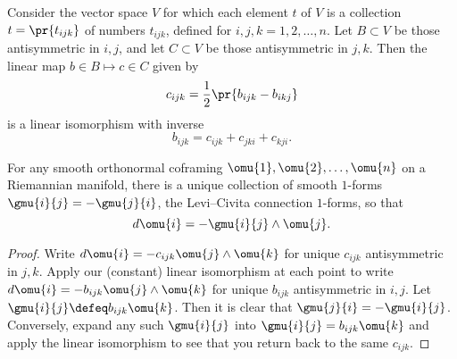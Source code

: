 \begin{lemma}
Consider the vector space \(V\) for which each element \(t\) of \(V\) is a collection \(t=\pr{t_{ijk}}\) of numbers \(t_{ijk}\), defined for \(i,j,k=1,2,\dots,n\).
Let \(B \subset V\) be those antisymmetric in \(i,j\), and let \(C \subset V\) be those antisymmetric in \(j,k\).
Then the linear map \(b \in B \mapsto c \in C\) given by
\[
c_{ijk} = \frac{1}{2}\pr{b_{ijk} - b_{ikj}}
\]
is a linear isomorphism with inverse
\[
b_{ijk} = c_{ijk} + c_{jki} + c_{kji}.
\]
\end{lemma}

\begin{lemma}\label{lemma:flrg.one}
For any smooth orthonormal coframing \(\omu{1}, \omu{2}, \dots, \omu{n}\) on a Riemannian manifold, there is a unique collection of smooth \(1\)-forms \(\gmu{i}{j}=-\gmu{j}{i}\), the Levi--Civita connection \(1\)-forms, so that 
\[
d\omu{i} = -\gmu{i}{j}\wedge\omu{j}.
\]
\end{lemma}
\begin{proof}
Write \(d\omu{i} = -c_{ijk}\omu{j}\wedge\omu{k}\) for unique \(c_{ijk}\) antisymmetric in \(j,k\).
Apply our (constant) linear isomorphism at each point to write \(d\omu{i} = -b_{ijk} \omu{j}\wedge\omu{k}\) for unique \(b_{ijk}\) antisymmetric in \(i,j\).
Let \(\gmu{i}{j}\defeq b_{ijk}\omu{k}\).
Then it is clear that \(\gmu{j}{i}=-\gmu{i}{j}\).
Conversely, expand any such \(\gmu{i}{j}\) into \(\gmu{i}{j}=b_{ijk}\omu{k}\) and apply the linear isomorphism to see that you return back to the same \(c_{ijk}\).
\end{proof}

